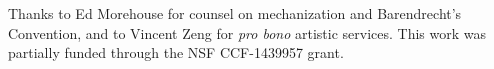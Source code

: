 Thanks to Ed Morehouse for counsel on mechanization and Barendrecht's
Convention, and to Vincent Zeng for \textit{pro bono} artistic services.
This work was partially funded through the NSF CCF-1439957 grant.
